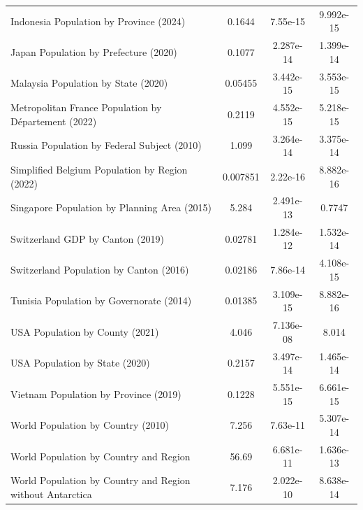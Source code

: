 \begin{tabular}{lccc}
                  Indonesia Population by Province (2024) &   0.1644 &  7.55e-15 &   9.992e-15 \\
                    Japan Population by Prefecture (2020) &   0.1077 & 2.287e-14 &   1.399e-14 \\
                      Malaysia Population by State (2020) &  0.05455 & 3.442e-15 &   3.553e-15 \\
     Metropolitan France Population by Département (2022) &   0.2119 & 4.552e-15 &   5.218e-15 \\
              Russia Population by Federal Subject (2010) &    1.099 & 3.264e-14 &   3.375e-14 \\
           Simplified Belgium Population by Region (2022) & 0.007851 &  2.22e-16 &   8.882e-16 \\
             Singapore Population by Planning Area (2015) &    5.284 & 2.491e-13 &      0.7747 \\
                         Switzerland GDP by Canton (2019) &  0.02781 & 1.284e-12 &   1.532e-14 \\
                  Switzerland Population by Canton (2016) &  0.02186 &  7.86e-14 &   4.108e-15 \\
                 Tunisia Population by Governorate (2014) &  0.01385 & 3.109e-15 &   8.882e-16 \\
                          USA Population by County (2021) &    4.046 & 7.136e-08 &       8.014 \\
                           USA Population by State (2020) &   0.2157 & 3.497e-14 &   1.465e-14 \\
                    Vietnam Population by Province (2019) &   0.1228 & 5.551e-15 &   6.661e-15 \\
                       World Population by Country (2010) &    7.256 &  7.63e-11 &   5.307e-14 \\
                   World Population by Country and Region &    56.69 & 6.681e-11 &   1.636e-13 \\
World Population by Country and Region without Antarctica &    7.176 & 2.022e-10 &   8.638e-14 \\
\bottomrule
\end{tabular}
